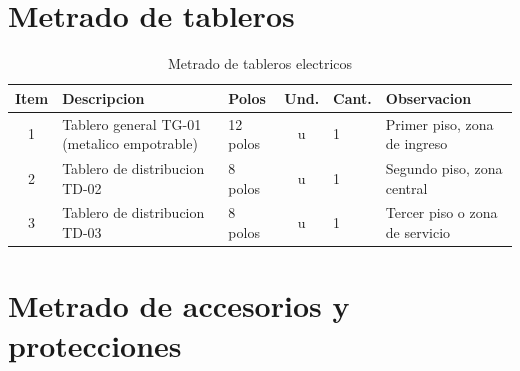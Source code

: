 \section{Metrado de tableros}

\begin{table}[H]
\centering
\small
\caption{Metrado de tableros electricos}
\label{tab:metrado-tableros}
\begin{tabularx}{\textwidth}{c L{4.5cm} L{1.8cm} c L{1.8cm} Y}
\toprule
\textbf{Item} & \textbf{Descripcion} & \textbf{Polos} & \textbf{Und.} & \textbf{Cant.} & \textbf{Observacion} \\
 & Tablero general TG-01 (metalico empotrable) & 12 polos & u & 1 & Primer piso, zona de ingreso \\
2 & Tablero de distribucion TD-02 & 8 polos & u & 1 & Segundo piso, zona central \\
3 & Tablero de distribucion TD-03 & 8 polos & u & 1 & Tercer piso o zona de servicio \\
\bottomrule
\end{tabularx}
\end{table}

\section{Metrado de accesorios y protecciones}

